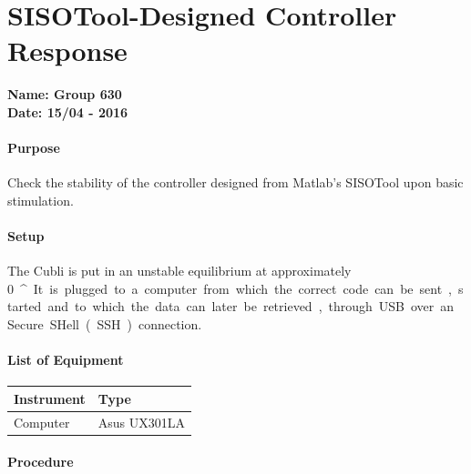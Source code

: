 \chapter{SISOTool-Designed Controller Response} \label{app:sisoToolDControllerTest}
\textbf{Name: Group 630}\\
\textbf{Date: 15/04 - 2016}

\subsubsection{Purpose}
Check the stability of the controller designed from Matlab's SISOTool upon basic stimulation.

\subsubsection{Setup}
The Cubli is put in an unstable equilibrium at approximately \SI{0}{^{\circ}}. 
It is plugged to a computer from which the correct code can be sent, started and to which the data can later be retrieved, through USB over an Secure SHell (SSH) connection.

\subsubsection{List of Equipment}
\begin{table}[H]
\begin{tabular}{|p{10cm}|p{4cm}|}
\hline%
  \textbf{Instrument}                &  \textbf{Type} \\
\hline%
  Computer                           &  Asus UX301LA  \\
\hline%
\end{tabular}
\end{table}

\subsubsection{Procedure}

